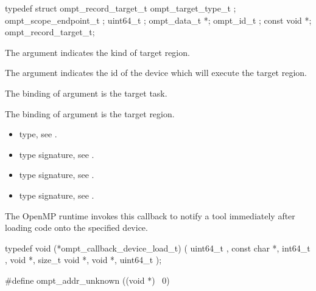 \record

\begin{ccppspecific}
\begin{omptRecord}
typedef struct ompt_record_target_t {
  ompt_target_type_t ;
  ompt_scope_endpoint_t ;
  uint64_t ;
  ompt_data_t *;
  ompt_id_t ;
  const void *;
} ompt_record_target_t;
\end{omptRecord}
\end{ccppspecific}


\argdesc

The argument  indicates the kind of target region.

\epdesc

The argument  indicates the id of the device
which will execute the target region.

The binding of argument  is the target task.

The binding of argument  is the target region.

\codeptrdesc

\crossreferences
\begin{itemize}
\item {} type, see
.
\item {} type signature, see
.
\item {} type signature, see
.
\item {} type signature, see
.
\end{itemize}

\label{sec:ompt_callback_device_load_t}

\summary
The OpenMP runtime invokes this callback to notify a tool immediately after loading code onto the specified device.

\format


\begin{ccppspecific}
\begin{omptCallback}
typedef void (*ompt_callback_device_load_t) (
  uint64_t ,
  const char *,
  int64_t ,
  void *,
  size_t 
  void *,
  void *,
  uint64_t 
);

#define ompt_addr_unknown  ((void *) ~0)
\end{omptCallback}

\end{ccppspecific}


